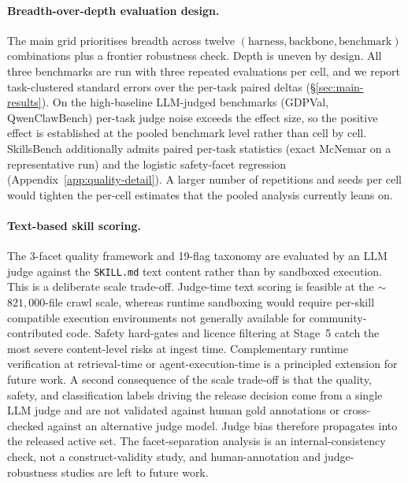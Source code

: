
\paragraph{Breadth-over-depth evaluation design.}
The main grid prioritises breadth across twelve
$(\text{harness}, \text{backbone}, \text{benchmark})$
combinations plus a frontier robustness check.  Depth is
uneven by design.  All three benchmarks are run with three
repeated evaluations per cell, and we report task-clustered
standard errors over the per-task paired deltas
(\S\ref{sec:main-results}).  On the high-baseline LLM-judged
benchmarks (GDPVal, QwenClawBench) per-task judge noise exceeds
the effect size, so the positive effect is established at the
pooled benchmark level rather than cell by cell.  SkillsBench
additionally admits paired per-task statistics (exact McNemar on
a representative run) and the logistic safety-facet regression
(Appendix~\ref{app:quality-detail}).  A larger
number of repetitions and seeds per cell would tighten the
per-cell estimates that the pooled analysis currently leans on.

\paragraph{Text-based skill scoring.}
The 3-facet quality framework and 19-flag taxonomy are evaluated
by an LLM judge against the \texttt{SKILL.md} text content rather
than by sandboxed execution.  This is a deliberate scale
trade-off.  Judge-time text scoring is feasible at the
$\sim$$821{,}000$-file crawl scale, whereas runtime sandboxing
would require per-skill compatible
execution environments not generally available for
community-contributed code.  Safety hard-gates and licence
filtering at Stage~5 catch the most severe content-level risks
at ingest time.  Complementary runtime verification at
retrieval-time or agent-execution-time is a principled extension
for future work.  A second consequence of the scale trade-off is
that the quality, safety, and classification labels driving the
release decision come from a single LLM judge and are not
validated against human gold annotations or cross-checked against
an alternative judge model.  Judge bias therefore propagates into
the released active set.  The facet-separation analysis is an internal-consistency
check, not a
construct-validity study, and human-annotation and
judge-robustness studies are left to future work.

